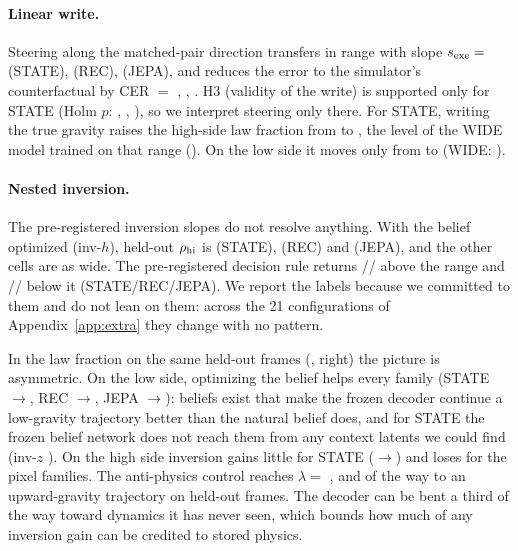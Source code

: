 \paragraph{Linear write.} Steering along the matched-pair direction transfers in range with slope
$s_{\rm exe}=$ \StateExeS{} (STATE), \RecExeS{} (REC), \JepaExeS{} (JEPA), and reduces the error
to the simulator's counterfactual by CER $=$ \StateCer{}, \RecCer{}, \JepaCer{}. H3 (validity of
the write) is supported only for STATE (Holm $p$: \PHThreeState, \PHThreeRec, \PHThreeJepa), so we
interpret steering only there. For STATE, writing the true gravity raises the high-side law fraction
from \StateLamNatHiPt{} to \StateLamSteerHiPt, the level of the WIDE model trained on that range
(\StateWideLamHi). On the low side it moves only from \StateLamNatLoPt{} to \StateLamSteerLoPt{}
(WIDE: \StateWideLamLo).

\paragraph{Nested inversion.} The pre-registered inversion slopes do not resolve anything. With the
belief optimized (inv-$h$), held-out $\rho_{\rm hi}$ is \StateInvHHi{} (STATE), \RecInvHHi{} (REC)
and \JepaInvHHi{} (JEPA), and the other cells are as wide. The pre-registered decision
rule returns \StateLocusHi/\RecLocusHi/\JepaLocusHi{} above the range and
\StateLocusLo/\RecLocusLo/\JepaLocusLo{} below it (STATE/REC/JEPA). We report the labels because we committed to them and do not lean on them: across the 21
configurations of Appendix~\ref{app:extra} they change with no pattern.

In the law fraction on the same held-out frames (, right) the picture is
asymmetric. On the low side, optimizing the belief helps every family (STATE
\StateHoldNatLo{}$\to$\StateHoldInvHLo, REC \RecHoldNatLo{}$\to$\RecHoldInvHLo, JEPA
\JepaHoldNatLo{}$\to$\JepaHoldInvHLo): beliefs exist that make the frozen decoder continue a
low-gravity trajectory better than the natural belief does, and for STATE the frozen belief network
does not reach them from any context latents we could find (inv-$z$ \StateHoldInvZLo). On the high
side inversion gains little for STATE (\StateHoldNatHi{}$\to$\StateHoldInvHHi) and loses for the
pixel families. The anti-physics control reaches $\lambda=$ \StateAntiLam, \RecAntiLam{} and
\JepaAntiLam{} of the way to an upward-gravity trajectory on held-out frames. The decoder can be
bent a third of the way toward dynamics it has never seen, which bounds how much of any inversion
gain can be credited to stored physics.

